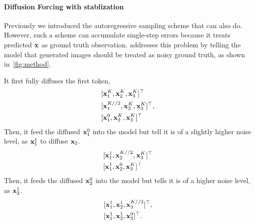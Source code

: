 \paragraph{Diffusion Forcing with stablization}
Previously we introduced the autoregressive sampling scheme that \algo{} can also do. However, such a scheme can accumulate single-step errors because it treats predicted $\mathbf{x}$ as ground truth observation. \algo{} addresses this problem by telling the model that generated images should be treated as noisy ground truth, as shown in~\ref{fig:method}. 

It first fully diffuses the first token, 
\begin{align*}
&[\mathbf{x}_1^K,\mathbf{x}_2^K,\mathbf{x}_3^K]^\top\\
&[\mathbf{x}_1^{K//2},\mathbf{x}_2^K,\mathbf{x}_3^K]^\top,\\
&[\mathbf{x}_1^{0},\mathbf{x}_2^{K},\mathbf{x}_3^{K}]^\top\\
\end{align*}
Then, it feed the diffused $\mathbf{x}_1^0$ into the model but tell it is of a slightly higher noise level, as $\mathbf{x}_1^{1}$ to diffuse $\mathbf{x}_2$.
\begin{align*}
&[\mathbf{x}_1^{1},\mathbf{x}_2^{K//2},\mathbf{x}_3^{K}]^\top\\
&[\mathbf{x}_1^{1},\mathbf{x}_2^{0},\mathbf{x}_3^{K}]^\top
\end{align*}
Then, it feeds the diffused $\mathbf{x}_2^0$ into the model but tells it is of a higher noise level, as $\mathbf{x}_2^{1}$.
\begin{align*}
&[\mathbf{x}_1^{1},\mathbf{x}_2^{1},\mathbf{x}_3^{K//2}]^\top,\\
&[\mathbf{x}_1^{1},\mathbf{x}_2^{1},\mathbf{x}_3^{0}]^\top.
\end{align*}

